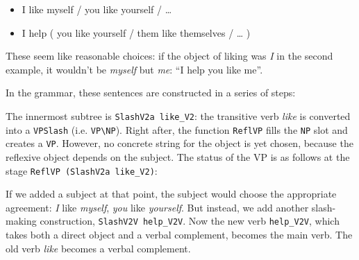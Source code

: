 \begin{itemize}
\itemsep1pt\parskip0pt
\item
  I like myself / you like yourself / \ldots{}
\item
  I help ( you like yourself / them like themselves / \ldots{} )
\end{itemize}

These seem like reasonable choices: if the object of liking was \emph{I}
in the second example, it wouldn't be \emph{myself} but \emph{me}: ``I
help you like me''.

In the \gf{} grammar, these sentences are constructed in a series of steps:

\begin{EmptyItem}
\begin{Highlighting}[]
 \NormalTok{(} 
       \NormalTok{(}
           \NormalTok{(} 
               \NormalTok{(}
                 \NormalTok{(} 
               \NormalTok{)}
           \NormalTok{)}
           \NormalTok{(} 
       \NormalTok{)}
\end{Highlighting}
\end{EmptyItem}

The innermost subtree is \texttt{SlashV2a like\_V2}: the transitive verb
\emph{like} is converted into a \texttt{VPSlash} (i.e.
\texttt{VP\textbackslash{}NP}). Right after, the function
\texttt{ReflVP} fills the \texttt{NP} slot and creates a \texttt{VP}.
However, no concrete string for the object is yet chosen, because the
reflexive object depends on the subject. The status of the VP is as
follows at the stage \texttt{ReflVP (SlashV2a like\_V2)}:

\begin{EmptyItem}
\begin{Highlighting}[]
    \FunctionTok{=}  \NormalTok{;}
\FunctionTok{=}  \OtherTok{=>}  \NormalTok{; } \OtherTok{=>}  
\FunctionTok{=} \NormalTok{[] ;}
\end{Highlighting}
\end{EmptyItem}

If we added a subject at that point, the subject would choose the
appropriate agreement: \emph{I} like \emph{myself}, \emph{you} like
\emph{yourself}. But instead, we add another slash-making construction,
\texttt{SlashV2V help\_V2V}. Now the new verb \texttt{help\_V2V}, which
takes both a direct object and a verbal complement, becomes the main
verb. The old verb \emph{like} becomes a verbal complement.

